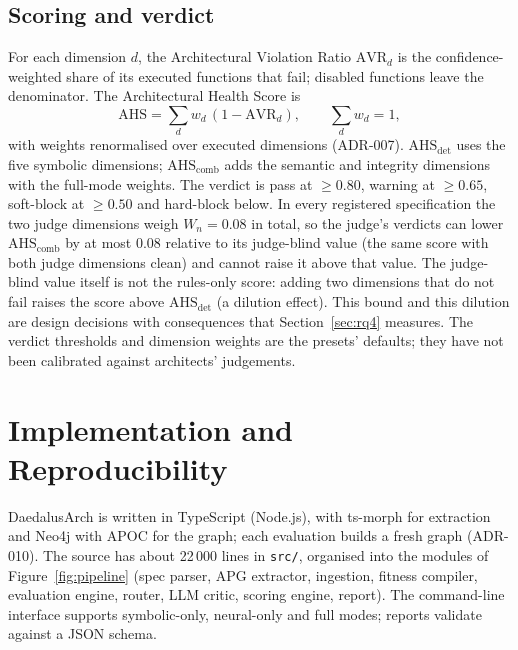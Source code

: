 \documentclass[10pt,a4paper]{article}
\newcommand{\tool}{DaedalusArch}
\begin{document}
\subsection{Scoring and verdict}\label{sec:scoring}

For each dimension $d$, the Architectural Violation Ratio $\mathrm{AVR}_d$ is the confidence-weighted share of its
executed functions that fail; disabled functions leave the denominator. The Architectural Health Score is
\begin{equation}
  \mathrm{AHS} = \sum_d w_d \, (1 - \mathrm{AVR}_d), \qquad \textstyle\sum_d w_d = 1,
\end{equation}
with weights renormalised over executed dimensions (ADR-007). $\mathrm{AHS}_{\mathrm{det}}$ uses the five symbolic
dimensions; $\mathrm{AHS}_{\mathrm{comb}}$ adds the semantic and integrity dimensions with the full-mode weights.
The verdict is pass at $\geq 0.80$, warning at $\geq 0.65$, soft-block at $\geq 0.50$ and hard-block below.
In every registered specification the two judge dimensions weigh $W_n = 0.08$ in total, so the judge's verdicts can
lower $\mathrm{AHS}_{\mathrm{comb}}$ by at most 0.08 relative to its judge-blind value (the same score with both
judge dimensions clean) and cannot raise it above that value.
The judge-blind value itself is not the rules-only score: adding two dimensions that do not fail raises the score
above $\mathrm{AHS}_{\mathrm{det}}$ (a dilution effect). This bound and this dilution are design decisions with
consequences that Section~\ref{sec:rq4} measures. The verdict thresholds and dimension weights are the presets'
defaults; they have not been calibrated against architects' judgements.

\section{Implementation and Reproducibility}\label{sec:impl}

\tool{} is written in TypeScript (Node.js), with ts-morph for extraction and Neo4j with APOC for the graph; each
evaluation builds a fresh graph (ADR-010). The source has about 22\,000 lines in \texttt{src/}, organised into the
modules of Figure~\ref{fig:pipeline} (spec parser, APG extractor, ingestion, fitness compiler, evaluation engine,
router, LLM critic, scoring engine, report). %
The command-line interface supports symbolic-only, neural-only and full modes; reports validate against a JSON
schema.
\end{document}
